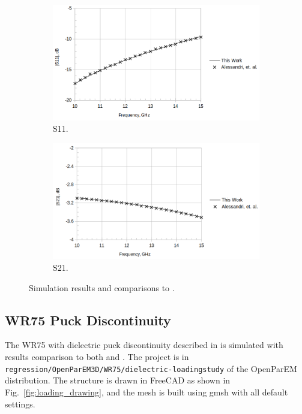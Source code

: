 \documentclass[titlepage]{article}
\renewcommand\_{\textunderscore\linebreak[1]}
\begin{document}
\begin{figure}[H]
  \centering
  \begin{subfigure}[t]{0.49\textwidth}
     \includegraphics[width=0.95\linewidth]{../regression/OpenParEM3D/WR75/T-Junction_study/screenshots/junction_S11}
     \caption{S11.}
  \end{subfigure}
  \begin{subfigure}[t]{0.49\textwidth}
     \includegraphics[width=0.95\linewidth]{../regression/OpenParEM3D/WR75/T-Junction_study/screenshots/junction_S21}
     \caption{S21.}
  \end{subfigure}
  \caption{Simulation results and comparisons to \cite{Alessandri}.}
  \label{fig:junction_results}
\end{figure}

\subsection{WR75 Puck Discontinuity}

The WR75 with dielectric puck discontinuity described in \cite{Ise} is simulated with results comparison to both \cite{Ise} and \cite{Hirayama}.  The project is in \texttt{regression/OpenParEM3D/WR75/dielectric-loading\_study} of the OpenParEM distribution.  The structure is drawn in FreeCAD as shown in Fig.~\ref{fig:loading_drawing}, and the mesh is built using gmsh with all default settings.
\end{document}
